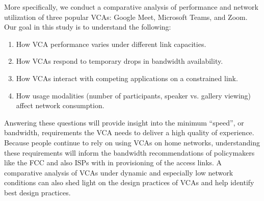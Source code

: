 More specifically, we conduct a comparative analysis of performance and network utilization of three popular VCAs: Google Meet, Microsoft Teams, and Zoom. %
Our goal in this study is to understand the following:
\begin{enumerate}[noitemsep]
    \item How VCA performance varies under different link capacities.
    \item How VCAs respond to temporary drops in bandwidth availability.
    \item How VCAs interact with competing applications on a constrained link.
    \item How usage modalities (number of participants, speaker vs. gallery viewing) affect network consumption.
\end{enumerate}

Answering these questions will provide insight into the minimum  ``speed'', or bandwidth, requirements the VCA needs to deliver a high quality of experience. Because people continue to rely on using VCAs on home networks, understanding these requirements will inform the bandwidth recommendations of policymakers like the FCC and also ISPs with in provisioning of the access links. A comparative analysis of VCAs under dynamic and especially low network conditions can also shed light on the design practices of VCAs and help identify best design practices. %

